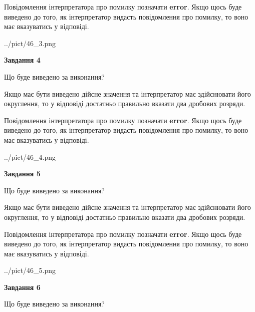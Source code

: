 \documentclass[12pt, ukrainian]{article}
\begin{document}
{\begin {Large}
Повідомлення інтерпретатора про помилку позначати \textbf{error}.
Якщо щось буде виведено до того, як інтерпретатор видасть повідомлення про помилку, 
то воно має вказуватись у відповіді. \par

\begin{center}
	{../pict/46_3.png}
\end{center}
\newpage

{\begin {center}\textbf{Завдання 4}\end {center}}\par
Що буде виведено за виконання? \par

Якщо має бути виведено дійсне значення та інтерпретатор має здійснювати його округлення, 
то у відповіді достатньо правильно вказати два дробових розряди.

Повідомлення інтерпретатора про помилку позначати \textbf{error}.
Якщо щось буде виведено до того, як інтерпретатор видасть повідомлення про помилку, 
то воно має вказуватись у відповіді. \par

\begin{center}
	{../pict/46_4.png}
\end{center}
\newpage

{\begin {center}\textbf{Завдання 5}\end {center}}\par
Що буде виведено за виконання? \par

Якщо має бути виведено дійсне значення та інтерпретатор має здійснювати його округлення, 
то у відповіді достатньо правильно вказати два дробових розряди.

Повідомлення інтерпретатора про помилку позначати \textbf{error}.
Якщо щось буде виведено до того, як інтерпретатор видасть повідомлення про помилку, 
то воно має вказуватись у відповіді. \par

\begin{center}
	{../pict/46_5.png}
\end{center}
\newpage

{\begin {center}\textbf{Завдання 6}\end {center}}\par
Що буде виведено за виконання? \par


\end{Large}}
\end{document}
